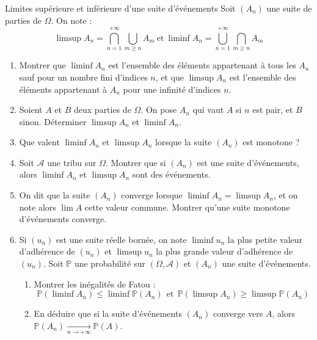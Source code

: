 \documentclass[french,a4paper]{article}
\renewcommand{\P}{\mathbb{P}}
\theoremstyle{plain}
\theoremstyle{definition}
\theoremstyle{remark}
\begin{document}
\begin{ex}{Limites supérieure et inférieure d'une suite d'événements}
	Soit $(A_n)$ une suite de parties de $\Omega$. On note : $$\limsup A_n=\bigcap_{n=1}^{+\infty}\bigcup_{m\geqslant n} A_m \ \text{et} \ \liminf A_n=\bigcup_{n=1}^{+\infty}\bigcap_{m\geqslant n} A_m$$
	\begin{enumerate}
		\item Montrer que $\liminf A_n$ est l'ensemble des éléments appartenant à tous les $A_n$ sauf pour un nombre fini d'indices $n$, et que $\limsup A_n$ est l'ensemble des éléments appartenant à $A_n$ pour une infinité d'indices $n$.
		\item Soient $A$ et $B$ deux parties de $\Omega$. On pose $A_n$ qui vaut $A$ si $n$ est pair, et $B$ sinon. Déterminer $\limsup A_n$ et $\liminf A_n$.
		\item Que valent $\liminf A_n$ et $\limsup A_n$ lorsque la suite $(A_n)$ est monotone ?
		\item Soit $\mathcal{A}$ une tribu sur $\Omega$. Montrer que si $(A_n)$ est une suite d'événements, alors $\liminf A_n$ et $\limsup A_n$ sont des événements.
		\item On dit que la suite $(A_n)$ converge lorsque $\liminf A_n=\limsup A_n$, et on note alors $\lim A$ cette valeur commune. Montrer qu'une suite monotone d'événements converge.
		\item Si $(u_n)$ est une suite réelle bornée, on note $\liminf u_n$ la plus petite valeur d'adhérence de $(u_n)$ et $\limsup u_n$ la plus grande valeur d'adhérence de $(u_n)$. Soit $\P$ une probabilité sur $(\Omega,\mathcal{A})$ et $(A_n)$ une suite d'événements.
		\begin{enumerate}[label=\alph*.]
			\item Montrer les inégalités de Fatou : $$\P(\liminf A_n)\leqslant\liminf\P(A_n) \ \ \text{et} \ \ \P(\limsup A_n)\geqslant\limsup\P(A_n)$$
			\item En déduire que si la suite d'événements $(A_n)$ converge vers $A$, alors $\P(A_n)\xrightarrow[n\to+\infty]{}\P(A)$.
		\end{enumerate}
	\end{enumerate}
\end{ex}
\end{document}
